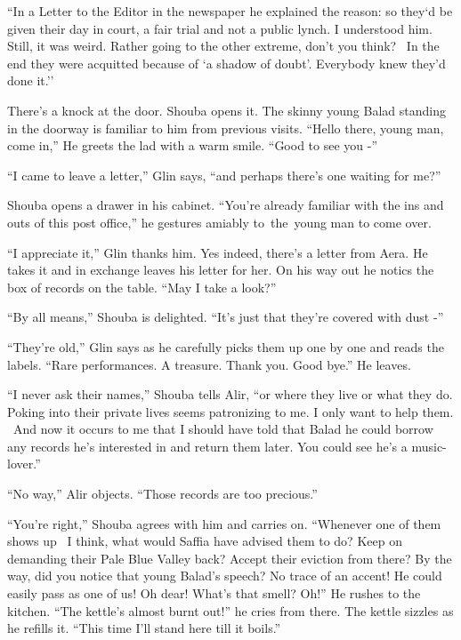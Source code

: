 \documentclass[twoside,11pt]{book}
\begin{document}
``In a Letter to the Editor in the newspaper he explained the reason: so they`d be given their day in
court, a fair trial and not a public lynch. I understood him. Still, it was weird. Rather going to the other extreme,
don't you think?{ \ }In the end they were acquitted because of `a shadow of
doubt'. Everybody knew they'd done it.''

There's a knock at the door. Shouba opens it. The skinny young Balad standing in the doorway is familiar to him from
previous visits. ``Hello there, young man, come in,'' He greets the lad with a warm smile.
``Good to see you -''

``I came to leave a letter,'' Glin says, ``and perhaps there's one waiting for
me?''

Shouba opens a drawer in his cabinet. ``You're already familiar with the ins and outs of this post
office,'' he gestures amiably to~the~young man to come over.

``I appreciate it,'' Glin thanks him. Yes indeed, there's a letter from Aera. He takes it and
in exchange leaves his letter for her. On his way out he notics the box of records on the table. ``May I
take a look?''

``By all means,'' Shouba is delighted. ``It's just that they're covered with dust
-''

``They're old,'' Glin says as he carefully picks them up one by one and reads the labels.
``Rare performances. A treasure. Thank you. Good bye.'' He leaves.

``I never ask their names,'' Shouba tells Alir, ``or where they live or what they do. Poking into their
private lives seems patronizing to me. I only want to help them. ~And now it occurs to me that I should have told that
Balad he could borrow any records he's interested in and return them later. You could see he's a
music-lover.''

``No way,'' Alir objects. ``Those records are too precious.''

``You're right,'' Shouba agrees with him and carries on. ``Whenever one of them
shows up \ I think, what would Saffia have advised them to do? Keep on demanding their Pale Blue Valley back? Accept
their eviction from there? By the way, did you notice that young Balad's speech? No trace of an accent! He could easily
pass as one of us! Oh dear! What's that smell? Oh!'' He rushes to the kitchen. ``The kettle's
almost burnt out!'' he cries from there. The kettle sizzles as he refills it. ``This time
I'll stand here till it boils.''
\end{document}
